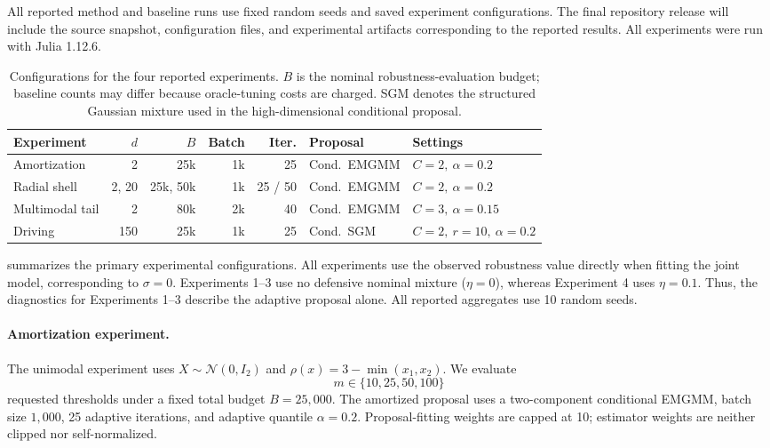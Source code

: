 All reported method and baseline runs use fixed random seeds and saved experiment configurations. The final repository release will include the source snapshot, configuration files, and experimental artifacts corresponding to the reported results. All experiments were run with Julia 1.12.6.

\begin{table}[ht!]
    \centering
    \small
    \caption{
    Configurations for the four reported experiments. \(B\) is the nominal robustness-evaluation budget; baseline counts may differ because oracle-tuning costs are charged. SGM denotes the structured Gaussian mixture used in the high-dimensional conditional proposal.
    }
    \label{tab:canonical-configurations}

    \begin{tabular}{@{}lrrrrll@{}}
        \toprule
        Experiment
        & $d$
        & $B$
        & Batch
        & Iter.
        & Proposal
        & Settings \\
        \midrule

        Amortization
        & 2
        & 25k
        & 1k
        & 25
        & Cond.\ EMGMM
        & $C=2,\ \alpha=0.2$ \\

        Radial shell
        & 2, 20
        & 25k, 50k
        & 1k
        & 25 / 50
        & Cond.\ EMGMM
        & $C=2,\ \alpha=0.2$ \\

        Multimodal tail
        & 2
        & 80k
        & 2k
        & 40
        & Cond.\ EMGMM
        & $C=3,\ \alpha=0.15$ \\

        Driving
        & 150
        & 25k
        & 1k
        & 25
        & Cond.\ SGM
        & $C=2,\ r=10,\ \alpha=0.2$ \\

        \bottomrule
    \end{tabular}
\end{table}

 summarizes the primary experimental configurations. All experiments use the observed robustness value directly when fitting the joint model, corresponding to $\sigma=0$. Experiments 1--3 use no defensive nominal mixture ($\eta=0$), whereas Experiment 4 uses $\eta=0.1$. Thus, the diagnostics for Experiments 1--3 describe the adaptive proposal alone. All reported aggregates use 10 random seeds.

\paragraph{Amortization experiment.}
The unimodal experiment uses $X\sim\mathcal N(0,I_2)$ and $\rho(x)=3-\min(x_1,x_2)$. We evaluate
\[
    m\in\{10,25,50,100\}
\]
requested thresholds under a fixed total budget $B=25{,}000$. The amortized proposal uses a two-component conditional EMGMM, batch size $1{,}000$, 25 adaptive iterations, and adaptive quantile $\alpha=0.2$. Proposal-fitting weights are capped at 10; estimator weights are neither clipped nor self-normalized.

